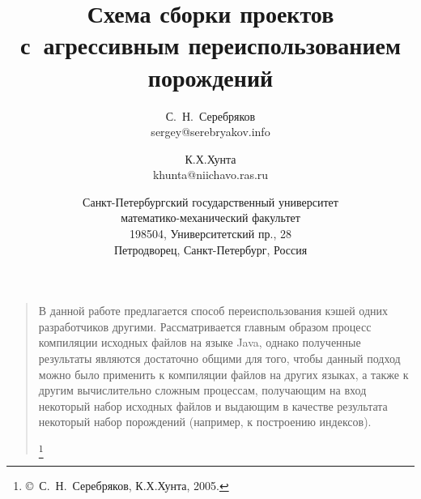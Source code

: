 \documentclass[a5paper]{article}
\title{Схема сборки проектов\\
с~агрессивным переиспользованием порождений}
\author{С.~Н.~Серебряков\\
sergey@serebryakov.info\\
\and
К.Х.Хунта\\
khunta@niichavo.ras.ru\\
\and Санкт-Петербургский государственный университет\\
математико-механический факультет\\
198504, Университетский пр., 28\\
Петродворец, Санкт-Петербург, Россия}
\date{}
\begin{document}
\maketitle
\thispagestyle{empty}

\begin{quote}
\small\noindent В данной работе предлагается способ переиспользования кэшей одних разработчиков другими. Рассматривается главным образом процесс компиляции исходных файлов на языке Java, однако полученные результаты являются достаточно общими для того, чтобы данный подход можно было применить к компиляции файлов на других языках, а также к другим вычислительно сложным процессам, получающим на вход некоторый набор исходных файлов и выдающим в качестве результата некоторый набор порождений (например, к построению индексов).

\renewcommand{\thefootnote}{}

\footnote{\small{\copyright~С.~Н.~Серебряков, К.Х.Хунта, 2005.}}
\renewcommand{\thefootnote}{\arabic{footnote}}
\setcounter{footnote}{0}
\end{quote}










\begin{thebibliography}{99}
\end{thebibliography}
\end{document}
